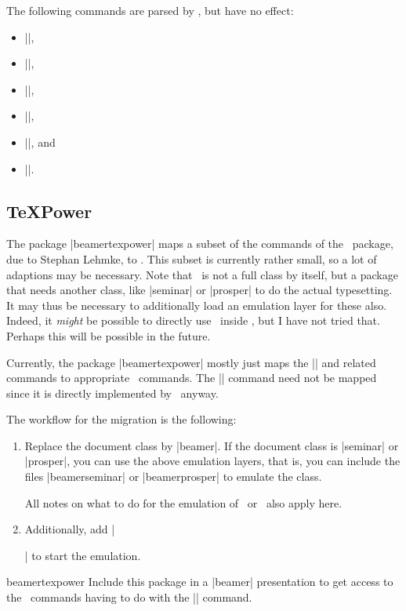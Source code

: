 The following commands are parsed by \beamer, but have no effect:
\begin{itemize}
  \item |\leftheader|,
  \item |\rightheader|,
  \item |\leftfooter|,
  \item |\rightfooter|,
  \item |\Restriction|, and
  \item |\marginpar|.
\end{itemize}


\subsection{\TeX Power}
\label{section-texpower}

The package |beamertexpower| maps a subset of the commands of the \texpower\ package, due to Stephan Lehmke, to \beamer. This subset is currently rather small, so a lot of adaptions may be necessary. Note that \texpower\ is not a full class by itself, but a package that needs another class, like |seminar| or |prosper| to do the actual typesetting. It may thus be necessary to additionally load an emulation layer for these also. Indeed, it \emph{might} be possible to directly use \texpower\ inside \beamer, but I have not tried that. Perhaps this will be possible in the future.

Currently, the package |beamertexpower| mostly just maps the |\stepwise| and related commands to appropriate \beamer\ commands. The |\pause| command need not be mapped since it is directly implemented by \beamer\ anyway.

The workflow for the migration is the following:
\begin{enumerate}
  \item
  Replace the document class by |beamer|. If the document class is |seminar| or |prosper|, you can use the above emulation layers, that is, you can include the files |beamerseminar| or |beamerprosper| to emulate the class.

  All notes on what to do for the emulation of \seminar\ or \prosper\ also apply here.
  \item
  Additionally, add |\usepackage{beamertexpower}| to start the emulation.
\end{enumerate}


\begin{package}{{beamertexpower}}
  Include this package in a |beamer| presentation to get access to the \texpower\ commands having to do with the |\stepwise| command.
\end{package}

